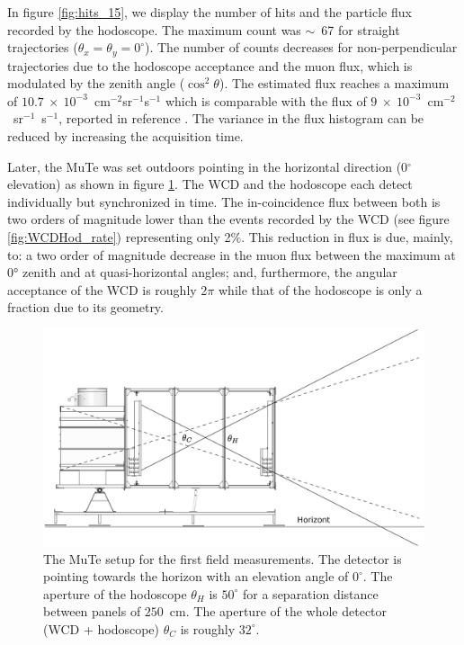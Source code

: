\documentclass[letterpaper,11pt]{article}
\begin{document}
In figure \ref{fig:hits_15}, we display the number of hits and the particle flux recorded by the hodoscope. The maximum count was $\sim$~67 for straight trajectories ($\theta_x=\theta_y=0^{\circ}$). The number of counts decreases for non-perpendicular trajectories due to the hodoscope acceptance and the muon flux, which is modulated by the zenith angle ($\cos^2 \theta$). The estimated flux reaches a maximum of $10.7~\times~10^{-3}$~cm$^{-2}$sr$^{-1}$s$^{-1}$ which is comparable with the flux of $9~\times~10^{-3}$~cm$^{-2}$~sr$^{-1}$~s$^{-1}$, reported in reference \cite{Lesparre2012} . The variance in the flux histogram can be reduced by increasing the acquisition time.
 
Later, the MuTe was set outdoors pointing in the horizontal direction (0$^{\circ}$ elevation) as shown in figure \ref{fig:WCDHod}. The WCD and the hodoscope each detect individually but synchronized in time. The in-coincidence flux between both is two orders of magnitude lower than the events recorded by the WCD (see figure \ref{fig:WCDHod_rate}) representing only 2$\%$. This reduction in flux is due, mainly, to:
a two order of magnitude decrease in the muon  flux between the maximum at 0° zenith and at quasi-horizontal angles;  and, furthermore, the angular acceptance of the WCD is roughly 2$\pi$ while that of the hodoscope is only a fraction due to its geometry.


\begin{figure}[htb]
\centering
\includegraphics[width=0.7\columnwidth]{Figures/Acceptance.eps}
\caption{The MuTe setup for the first field measurements. The detector is pointing towards the horizon with an elevation angle of $0^{\circ}$. The aperture of the hodoscope $\theta_H$ is $50^{\circ}$ for a separation distance between panels of $250$~cm. The aperture of the whole detector (WCD + hodoscope) $\theta_C$ is roughly $32^{\circ}$.}
\label{fig:WCDHod}
\end{figure}
\end{document}

